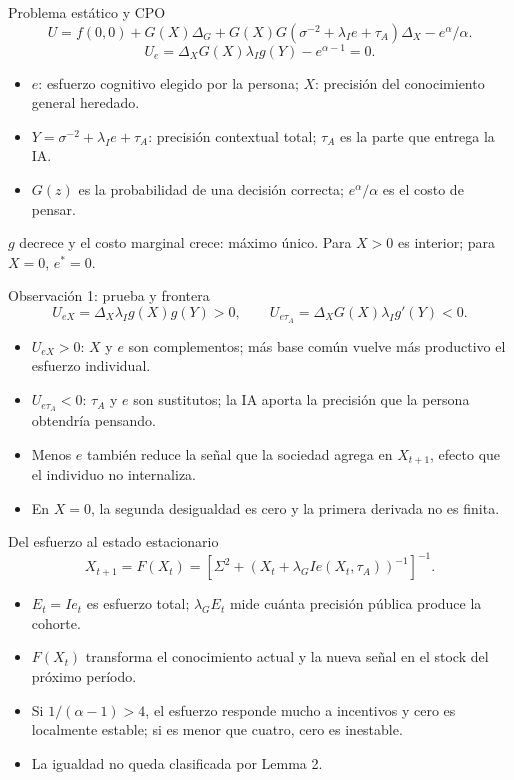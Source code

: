 \documentclass[aspectratio=169,10pt]{beamer}
\begin{document}
\begin{frame}{Problema estático y CPO}
\[
U=f(0,0)+G(X)\Delta_G+G(X)G(\sigma^{-2}+\lambda_Ie+\tau_A)\Delta_X-e^\alpha/\alpha.
\]
\[
U_e=\Delta_XG(X)\lambda_Ig(Y)-e^{\alpha-1}=0.
\]
\begin{itemize}\item $e$: esfuerzo cognitivo elegido por la persona; $X$: precisión del conocimiento general heredado.
\item $Y=\sigma^{-2}+\lambda_Ie+\tau_A$: precisión contextual total; $\tau_A$ es la parte que entrega la IA.
\item $G(z)$ es la probabilidad de una decisión correcta; $e^\alpha/\alpha$ es el costo de pensar.
\end{itemize}
$g$ decrece y el costo marginal crece: máximo único. Para $X>0$ es interior; para $X=0$, $e^*=0$.
\end{frame}
\begin{frame}{Observación 1: prueba y frontera}
\[
U_{eX}=\Delta_X\lambda_Ig(X)g(Y)>0,\qquad
U_{e\tau_A}=\Delta_XG(X)\lambda_Ig'(Y)<0.
\]
\begin{itemize}\item $U_{eX}>0$: $X$ y $e$ son complementos; más base común vuelve más productivo el esfuerzo individual.\item $U_{e\tau_A}<0$: $\tau_A$ y $e$ son sustitutos; la IA aporta la precisión que la persona obtendría pensando.\item Menos $e$ también reduce la señal que la sociedad agrega en $X_{t+1}$, efecto que el individuo no internaliza.\item En $X=0$, la segunda desigualdad es cero y la primera derivada no es finita.\end{itemize}
\end{frame}
\begin{frame}{Del esfuerzo al estado estacionario}
\[
X_{t+1}=F(X_t)=\left[\Sigma^2+(X_t+\lambda_GIe(X_t,\tau_A))^{-1}\right]^{-1}.
\]
\begin{itemize}\item $E_t=I e_t$ es esfuerzo total; $\lambda_GE_t$ mide cuánta precisión pública produce la cohorte.\item $F(X_t)$ transforma el conocimiento actual y la nueva señal en el stock del próximo período.\item Si $1/(\alpha-1)>4$, el esfuerzo responde mucho a incentivos y cero es localmente estable; si es menor que cuatro, cero es inestable.\item La igualdad no queda clasificada por Lemma 2.
\end{itemize}
\end{frame}
\end{document}

